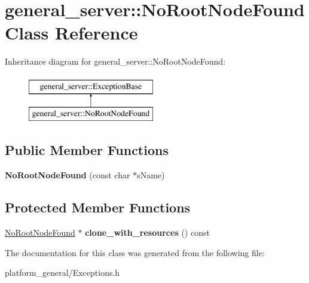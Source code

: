 \hypertarget{classgeneral__server_1_1NoRootNodeFound}{\section{general\-\_\-server\-:\-:\-No\-Root\-Node\-Found \-Class \-Reference}
\label{classgeneral__server_1_1NoRootNodeFound}
}
\-Inheritance diagram for general\-\_\-server\-:\-:\-No\-Root\-Node\-Found\-:\begin{figure}[H]
\begin{center}
\leavevmode
\includegraphics[height=2.000000cm]{classgeneral__server_1_1NoRootNodeFound}
\end{center}
\end{figure}
\subsection*{\-Public \-Member \-Functions}
\begin{DoxyCompactItemize}
\item 
\hypertarget{classgeneral__server_1_1NoRootNodeFound_a9b30f97a8491a8522aecc0847305a58f}{{\bfseries \-No\-Root\-Node\-Found} (const char $\ast$s\-Name)}\label{classgeneral__server_1_1NoRootNodeFound_a9b30f97a8491a8522aecc0847305a58f}

\end{DoxyCompactItemize}
\subsection*{\-Protected \-Member \-Functions}
\begin{DoxyCompactItemize}
\item 
\hypertarget{classgeneral__server_1_1NoRootNodeFound_a66dacfec447e2d5fac82bcb307c3d2f7}{\hyperlink{classgeneral__server_1_1NoRootNodeFound}{\-No\-Root\-Node\-Found} $\ast$ {\bfseries clone\-\_\-with\-\_\-resources} () const }\label{classgeneral__server_1_1NoRootNodeFound_a66dacfec447e2d5fac82bcb307c3d2f7}

\end{DoxyCompactItemize}


\-The documentation for this class was generated from the following file\-:\begin{DoxyCompactItemize}
\item 
platform\-\_\-general/\-Exceptions.\-h\end{DoxyCompactItemize}
